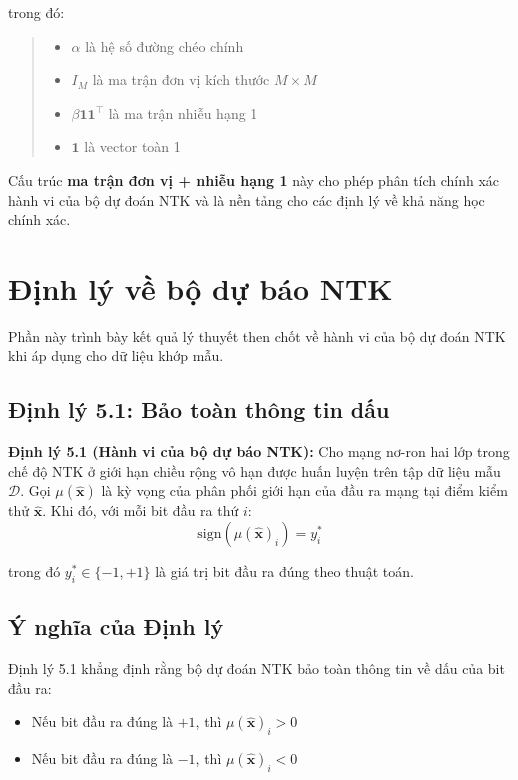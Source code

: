trong đó:
\begin{quote}
\begin{itemize}
    \item $\alpha$ là hệ số đường chéo chính
    \item $I_M$ là ma trận đơn vị kích thước $M \times M$
    \item $\beta \mathbf{1}\mathbf{1}^\top$ là ma trận nhiễu hạng 1
    \item $\mathbf{1}$ là vector toàn 1
\end{itemize}
\end{quote}

Cấu trúc \textbf{ma trận đơn vị + nhiễu hạng 1} này cho phép phân tích chính xác hành vi của bộ dự đoán NTK và là nền tảng cho các định lý về khả năng học chính xác.

\section{Định lý về bộ dự báo NTK}

Phần này trình bày kết quả lý thuyết then chốt về hành vi của bộ dự đoán NTK khi áp dụng cho dữ liệu khớp mẫu.

\subsection{Định lý 5.1: Bảo toàn thông tin dấu}

    	\textbf{Định lý 5.1 (Hành vi của bộ dự báo NTK):} Cho mạng nơ-ron hai lớp trong chế độ NTK ở giới hạn chiều rộng vô hạn được huấn luyện trên tập dữ liệu mẫu $\mathcal{D}$. Gọi $\mu(\hat{\mathbf{x}})$ là kỳ vọng của phân phối giới hạn của đầu ra mạng tại điểm kiểm thử $\hat{\mathbf{x}}$. Khi đó, với mỗi bit đầu ra thứ $i$:
\begin{equation}
    \text{sign}(\mu(\hat{\mathbf{x}})_i) = y_i^*
\end{equation}

trong đó $y_i^* \in \{-1, +1\}$ là giá trị bit đầu ra đúng theo thuật toán.

\subsection{Ý nghĩa của Định lý}

Định lý 5.1 khẳng định rằng bộ dự đoán NTK bảo toàn thông tin về dấu của bit đầu ra:
\begin{itemize}
    \item Nếu bit đầu ra đúng là $+1$, thì $\mu(\hat{\mathbf{x}})_i > 0$
    \item Nếu bit đầu ra đúng là $-1$, thì $\mu(\hat{\mathbf{x}})_i < 0$
\end{itemize}

